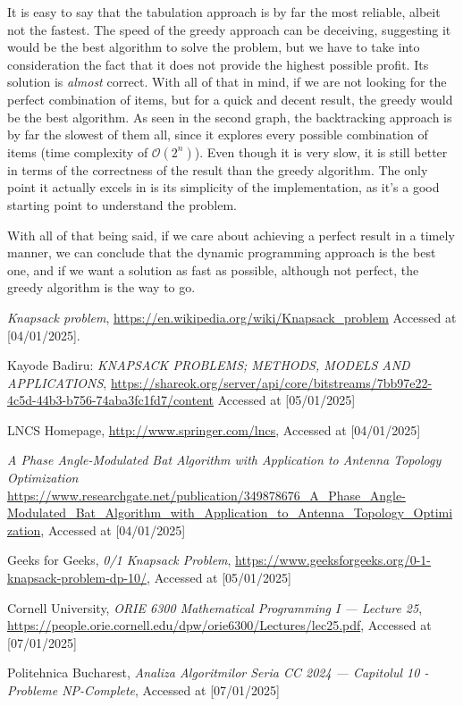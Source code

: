 \documentclass{llncs}
\begin{document}
It is easy to say that the tabulation approach is by far the most reliable, albeit
not the fastest. The speed of the greedy approach can be deceiving, suggesting it would be
the best algorithm to solve the problem, but we have to take into consideration the fact
that it does not provide the highest possible profit. Its solution is \textit{almost} correct.
With all of that in mind, if we are not looking for the perfect combination of items, but
for a quick and decent result, the greedy would be the best algorithm. As seen in the second graph,
the backtracking approach is by far the slowest of them all, since it explores every possible combination of items
(time complexity of $\mathcal{O}(2^n)$). Even though it is very slow, it is still better in terms of
the correctness of the result than the greedy algorithm. The only point it actually excels in
is its simplicity of the implementation, as it's a good starting point to understand the problem.

With all of that being said, if we care about achieving a perfect result in a timely manner,
we can conclude that the dynamic programming approach is the best one, and if we want a
solution as fast as possible, although not perfect, the greedy algorithm is the way to go.


\begin{thebibliography}{8}

\emph{Knapsack problem}, \url{https://en.wikipedia.org/wiki/Knapsack_problem} Accessed at [04/01/2025].

Kayode Badiru: \emph{KNAPSACK PROBLEMS; METHODS, MODELS AND APPLICATIONS},
\url{https://shareok.org/server/api/core/bitstreams/7bb97e22-4c5d-44b3-b756-74aba3fc1fd7/content} 
Accessed at [05/01/2025]

LNCS Homepage, \url{http://www.springer.com/lncs}, Accessed at [04/01/2025]

\emph{A Phase Angle-Modulated Bat Algorithm with Application to Antenna Topology Optimization}
\url{https://www.researchgate.net/publication/349878676_A_Phase_Angle-Modulated_Bat_Algorithm_with_Application_to_Antenna_Topology_Optimization}, Accessed at [04/01/2025]

Geeks for Geeks, \emph{0/1 Knapsack Problem}, \url{https://www.geeksforgeeks.org/0-1-knapsack-problem-dp-10/}, Accessed at [05/01/2025]

Cornell University, \emph{ORIE 6300 Mathematical Programming I --- Lecture 25}, \url{https://people.orie.cornell.edu/dpw/orie6300/Lectures/lec25.pdf}, Accessed at [07/01/2025]

Politehnica Bucharest, \emph{Analiza Algoritmilor Seria CC 2024 --- Capitolul 10 - Probleme NP-Complete}, Accessed at [07/01/2025]

\end{thebibliography}
\end{document}
